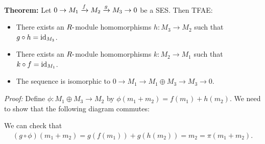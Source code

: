 \begin{center}
\end{center}

\textbf{Theorem:} Let \(0 \to M_1 \xrightarrow{f} M_2 \xrightarrow{g} M_3 \to 0\)
be a SES. Then TFAE:

\begin{itemize}
\item
  There exists an \(R{\hbox{-}}\)module homomorphisms \(h: M_3 \to M_2\) such
  that \(g\circ h = \text{id}_{M_3}\).
\item
  There exists an \(R{\hbox{-}}\)module homomorphisms \(k: M_2 \to M_1\) such
  that \(k\circ f = \text{id}_{M_1}\).
\item
  The sequence is isomorphic to
  \(0 \to M_1 \to M_1 \oplus M_3 \to M_3 \to 0\).
\end{itemize}

\emph{Proof:} Define \(\phi: M_1 \oplus M_3 \to M_2\) by
\(\phi(m_1 + m_2) = f(m_1) + h(m_2)\). We need to show that the
following diagram commutes:

\begin{center}
\end{center}

We can check that
\begin{align*}
(g\circ \phi)(m_1 + m_2) = g( f(m_1)) +  g(h(m_2)) = m_2 = \pi(m_1 + m_2).\end{align*}

